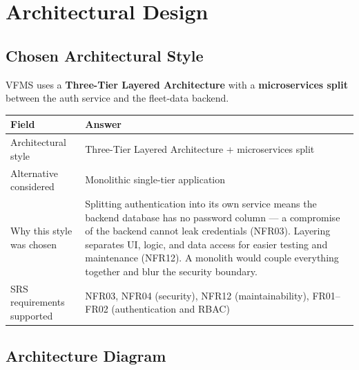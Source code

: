 \documentclass[11pt,a4paper]{article}
\begin{document}
\section{Architectural Design}

\subsection{Chosen Architectural Style}
VFMS uses a \textbf{Three-Tier Layered Architecture} with a \textbf{microservices split} between the auth service and the fleet-data backend.

\begin{table}[H]
\centering
\begin{tabularx}{\textwidth}{|p{4cm}|X|}
\hline
\textbf{Field} & \textbf{Answer} \\
\hline
Architectural style & Three-Tier Layered Architecture + microservices split \\
\hline
Alternative considered & Monolithic single-tier application \\
\hline
Why this style was chosen & Splitting authentication into its own service means the backend database has no password column --- a compromise of the backend cannot leak credentials (NFR03). Layering separates UI, logic, and data access for easier testing and maintenance (NFR12). A monolith would couple everything together and blur the security boundary. \\
\hline
SRS requirements supported & NFR03, NFR04 (security), NFR12 (maintainability), FR01--FR02 (authentication and RBAC) \\
\hline
\end{tabularx}
\end{table}

\subsection{Architecture Diagram}
\end{document}
